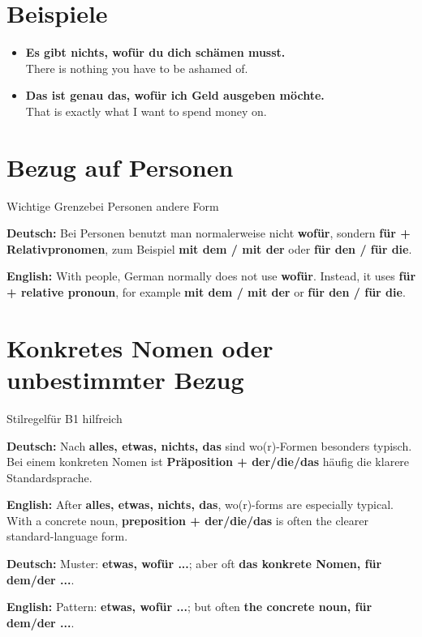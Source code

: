 \documentclass[a4paper,11pt]{article}
\newcommand{\GermanText}[1]{\textbf{Deutsch: }#1\par}
\newcommand{\EnglishText}[1]{{\small\color{SoftGray}\textbf{English: }#1\par}}
\newcommand{\ExampleItem}[2]{\item \textbf{#1}\\{\small\color{SoftGray}#2}}
\begin{document}
\section{Beispiele}

\begin{exbox}

\begin{itemize}

\ExampleItem{Es gibt nichts, wofür du dich schämen musst.}{There is nothing you have to be ashamed of.}

\ExampleItem{Das ist genau das, wofür ich Geld ausgeben möchte.}{That is exactly what I want to spend money on.}

\end{itemize}

\end{exbox}

\section{Bezug auf Personen}

\begin{grammarentry}{Wichtige Grenze}{bei Personen andere Form}

\GermanText{Bei Personen benutzt man normalerweise nicht \textbf{wofür}, sondern \textbf{für + Relativpronomen}, zum Beispiel \textbf{mit dem / mit der} oder \textbf{für den / für die}.}

\EnglishText{With people, German normally does not use \textbf{wofür}. Instead, it uses \textbf{für + relative pronoun}, for example \textbf{mit dem / mit der} or \textbf{für den / für die}.}

\end{grammarentry}

\section{Konkretes Nomen oder unbestimmter Bezug}

\begin{grammarentry}{Stilregel}{für B1 hilfreich}

\GermanText{Nach \textbf{alles, etwas, nichts, das} sind wo(r)-Formen besonders typisch. Bei einem konkreten Nomen ist \textbf{Präposition + der/die/das} häufig die klarere Standardsprache.}

\EnglishText{After \textbf{alles, etwas, nichts, das}, wo(r)-forms are especially typical. With a concrete noun, \textbf{preposition + der/die/das} is often the clearer standard-language form.}

\GermanText{Muster: \textbf{etwas, wofür ...}; aber oft \textbf{das konkrete Nomen, für dem/der ...}.}

\EnglishText{Pattern: \textbf{etwas, wofür ...}; but often \textbf{the concrete noun, für dem/der ...}.}

\end{grammarentry}
\end{document}
